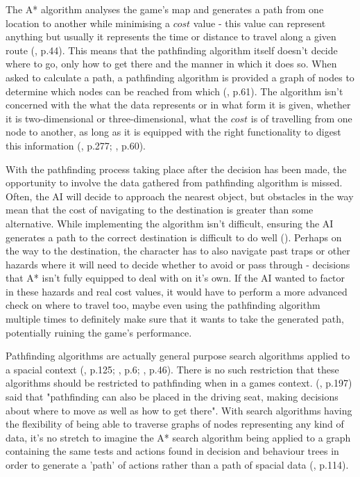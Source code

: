 \documentclass[10pt]{article}
\begin{document}
The A* algorithm analyses the game's map and generates a path from one location to another while minimising a $cost$ value - this value can represent anything but usually it represents the time or distance to travel along a given route (\cite{yap2002grid}, p.44). This means that the pathfinding algorithm itself doesn't decide where to go, only how to get there and the manner in which it does so. When asked to calculate a path, a pathfinding algorithm is provided a graph of nodes to determine which nodes can be reached from which (\cite{nareyek2004ai}, p.61). The algorithm isn't concerned with the what the data represents or in what form it is given, whether it is two-dimensional or three-dimensional, what the $cost$ is of travelling from one node to another, as long as it is equipped with the right functionality to digest this information (\cite{millington2019ai}, p.277; \cite{graham2003pathfinding}, p.60).

With the pathfinding process taking place after the decision has been made, the opportunity to involve the data gathered from pathfinding algorithm is missed. Often, the AI will decide to approach the nearest object, but obstacles in the way mean that the cost of navigating to the destination is greater than some alternative. While implementing the algorithm isn't difficult, ensuring the AI generates a path to the correct destination is difficult to do well (\cite{forbus2002qualitative}). Perhaps on the way to the destination, the character has to also navigate past traps or other hazards where it will need to decide whether to avoid or pass through - decisions that A* isn't fully equipped to deal with on it's own. If the AI wanted to factor in these hazards and real cost values, it would have to perform a more advanced check on where to travel too, maybe even using the pathfinding algorithm multiple times to definitely make sure that it wants to take the generated path, potentially ruining the game's performance.

Pathfinding algorithms are actually general purpose search algorithms applied to a spacial context (\cite{cui2011based}, p.125; \cite{orkin2003applying}, p.6; \cite{yap2002grid}, p.46). There is no such restriction that these algorithms should be restricted to pathfinding when in a games context. \citeauthor{millington2019ai} (\citeyear{millington2019ai}, p.197) said that "pathfinding can also be placed in the driving seat, making decisions about where to move as well as how to get there". With search algorithms having the flexibility of being able to traverse graphs of nodes representing any kind of data, it's no stretch to imagine the A* search algorithm being applied to a graph containing the same tests and actions found in decision and behaviour trees in order to generate a 'path' of actions rather than a path of spacial data (\cite{higgins2002generic}, p.114).
\end{document}
